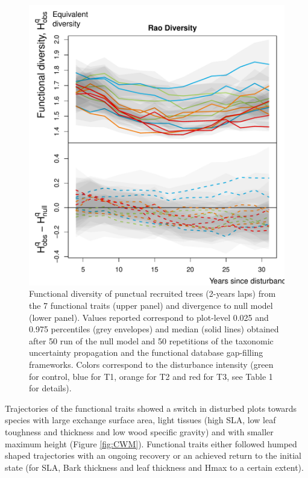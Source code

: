 \documentclass[fleqn,10pt]{ArtEcoFoG} %
\begin{document}
\begin{figure}

{\centering \includegraphics{RecruitmentTrajectories_files/figure-latex/FunTraj-1} 

}

\caption{Functional diversity of punctual recruited trees (2-years laps) from the 7 functional traits (upper panel) and divergence to null model (lower panel). Values reported correspond to plot-level 0.025 and 0.975 percentiles (grey envelopes) and median (solid lines) obtained after 50 run of the null model and 50 repetitions of the taxonomic uncertainty propagation and the functional database gap-filling frameworks. Colors correspond to the disturbance intensity (green for control, blue for T1, orange for T2 and red for T3, see Table 1 for details).}\label{fig:FunTraj}
\end{figure}

Trajectories of the functional traits showed a switch in disturbed plots
towards species with large exchange surface area, light tissues (high
SLA, low leaf toughness and thickness and low wood specific gravity) and
with smaller maximum height (Figure \ref{fig:CWM}). Functional traits
either followed humped shaped trajectories with an ongoing recovery or
an achieved return to the initial state (for SLA, Bark thickness and
leaf thickness and Hmax to a certain extent).
\end{document}

